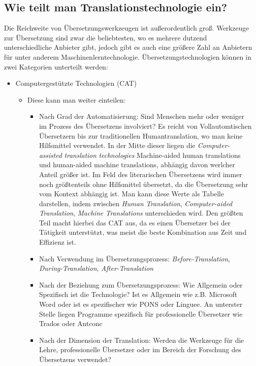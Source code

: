 \documentclass{article}
\begin{document}
	\subsection{Wie teilt man Translationstechnologie ein?}
	Die Reichweite von Übersetzungswerkzeugen ist außerordentlich groß. Werkzeuge zur Übersetzung sind zwar die beliebtesten, wo es mehrere dutzend unterschiedliche Anbieter gibt, jedoch gibt es auch eine größere Zahl an Anbietern für unter anderem Maschinenlerntechnologie.
	Übersetzungstechnologien können in zwei Kategorien unterteilt werden:
	\begin{itemize}
		\item{Computergestützte Technologien (CAT)}
		\begin{itemize}
			\item{Diese kann man weiter einteilen:}
			\begin{itemize}
				\item{Nach Grad der Automatisierung: Sind Menschen mehr oder weniger im Prozess des Übersetzens involviert? Es reicht von Vollautomtischen Übersetzern bis zur traditionellen Humantranslation, wo man keine Hilfsmittel verwendet. In der Mitte dieser liegen die \textit{Computer-assisted translation technologies} Machine-aided human translations und human-aided machine translations, abhängig davon werlcher Anteil größer ist. Im Feld des literarischen Übersetzens wird immer noch größtenteils ohne Hilfsmittel übersetzt, da die Übersetzung sehr vom Kontext abhängig ist. Man kann diese Werte als Tabelle darstellen, indem zwischen \textit{Human Translation}, \textit{Computer-aided Translation}, \textit{Machine Translations} unterschieden wird. Den größten Teil macht hierbei das CAT aus, da es einen Übersetzer bei der Tätigkeit unterstützt, was meist die beste Kombination aus Zeit und Effizienz ist.}
				\item{Nach Verwendung im Übersetzungsprozess: \textit{Before-Translation}, \textit{During-Translation}, \textit{After-Translation}}
				\item{Nach der Beziehung zum Übersetzungsprozess: Wie Allgemein oder Spezifisch ist die Technologie? Ist es Allgemein wie z.B. Microsoft Word oder ist es spezifischer wie PONS oder Linguee. An unterster Stelle liegen Programme spezifisch für professionelle Übersetzer wie Trados oder Antconc}
				\item{Nach der Dimension der Translation: Werden die Werkzeuge für die Lehre, professionelle Übersetzer oder im Bereich der Forschung des Übersetzens verwendet?}
			\end{itemize}
		\end{itemize}
	\end{itemize}
\end{document}
